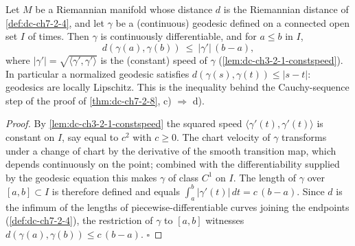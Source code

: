 \begin{lemma}
  \label{lem:dc-ch7-2-8-lipschitz}
  \leanok
  Let $M$ be a Riemannian manifold whose distance $d$ is the Riemannian
  distance of \cref{def:dc-ch7-2-4}, and let $\gamma$ be a (continuous)
  geodesic defined on a connected open set $I$ of times. Then $\gamma$ is
  continuously differentiable, and for $a\le b$ in $I$,
  $$
  d(\gamma(a),\gamma(b))\ \le\ |\gamma'|\,(b-a),
  $$
  where $|\gamma'|=\sqrt{\langle\gamma',\gamma'\rangle}$ is the (constant)
  speed of $\gamma$ (\cref{lem:dc-ch3-2-1-constspeed}). In particular a
  normalized geodesic satisfies $d(\gamma(s),\gamma(t))\le|s-t|$: geodesics
  are locally Lipschitz. This is the inequality behind the Cauchy-sequence
  step of the proof of \cref{thm:dc-ch7-2-8}, c) $\Rightarrow$ d).
\end{lemma}
\begin{proof}
  \leanok
  By \cref{lem:dc-ch3-2-1-constspeed} the squared speed
  $\langle\gamma'(t),\gamma'(t)\rangle$ is constant on $I$, say equal to
  $c^2$ with $c\ge 0$. The chart velocity of $\gamma$ transforms under a
  change of chart by the derivative of the smooth transition map, which
  depends continuously on the point; combined with the differentiability
  supplied by the geodesic equation this makes $\gamma$ of class $C^1$ on
  $I$. The length of $\gamma$ over $[a,b]\subset I$ is therefore defined and
  equals $\int_a^b|\gamma'(t)|\,dt=c\,(b-a)$. Since $d$ is the infimum of the
  lengths of piecewise-differentiable curves joining the endpoints
  (\cref{def:dc-ch7-2-4}), the restriction of $\gamma$ to $[a,b]$ witnesses
  $d(\gamma(a),\gamma(b))\le c\,(b-a)$. $\square$
\end{proof}

